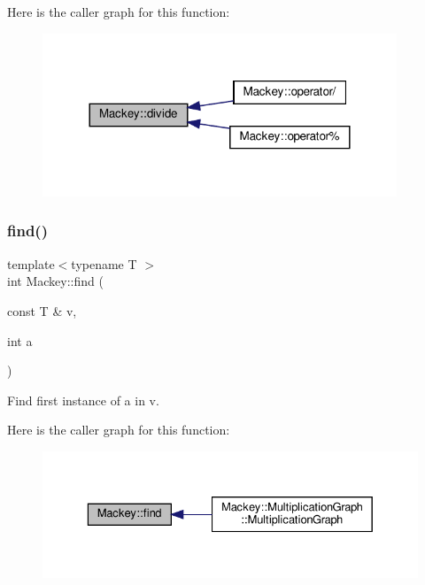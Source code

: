 Here is the caller graph for this function\+:\nopagebreak
\begin{figure}[H]
\begin{center}
\leavevmode
\includegraphics[width=300pt]{namespaceMackey_a04fadcf186ab504cafeb259178ee4827_icgraph}
\end{center}
\end{figure}
\mbox{\label{namespaceMackey_a74984d054f1f943ab61dd0415347f141}} 
\subsubsection{\texorpdfstring{find()}{find()}}
{\footnotesize\ttfamily template$<$typename T $>$ \\
int Mackey\+::find (\begin{DoxyParamCaption}\item[{const T \&}]{v,  }\item[{int}]{a }\end{DoxyParamCaption})}



Find first instance of a in v. 

Here is the caller graph for this function\+:\nopagebreak
\begin{figure}[H]
\begin{center}
\leavevmode
\includegraphics[width=329pt]{namespaceMackey_a74984d054f1f943ab61dd0415347f141_icgraph}
\end{center}
\end{figure}
\mbox{\label{namespaceMackey_ab5bc349f95c14d448e42622de2d6a448}} 
